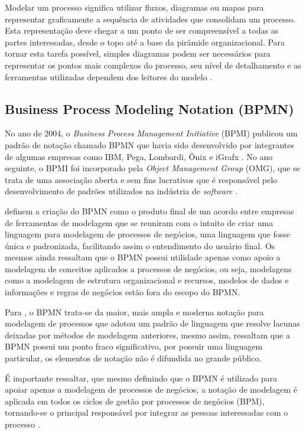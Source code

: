 \documentclass[
	12pt,				%
	openright,			%
	oneside,			%
	a4paper,			%
	chapter=TITLE,		%
	section=TITLE,		%
	english,			%
	french,				%
	spanish,			%
	brazil				%
	]{abntex2}
\begin{document}
Modelar um processo significa utilizar fluxos, diagramas ou mapas para representar graficamente a sequência de atividades que consolidam um processo. Esta representação deve chegar a um ponto de ser compreensível a todas as partes interessadas, desde o topo até a base da pirâmide organizacional. Para tornar esta tarefa possível, simples diagramas podem ser necessários para representar os pontos mais complexos do processo, seu nível de detalhamento e as ferramentas utilizadas dependem dos leitores do modelo \cite{juniorMapeamentoGestaoProcessos}.


\subsection{Business Process Modeling Notation (BPMN)}
No ano de 2004, o \textit{Business Process Management Initiative} (BPMI) publicou um padrão de notação chamado BPMN que havia sido desenvolvido por integrantes de algumas empresas como IBM, Pega, Lombardi, Ônix e iGrafx \cite{valleBarbaraBPMN}. No ano seguinte, o BPMI foi incorporado pela \textit{Object Management Group} (OMG), que se trata de uma associação aberta e sem fins lucrativos que é responsável pelo desenvolvimento de padrões utilizados na indústria de \textit{software} \cite{araujoGestao}.

 definem a criação do BPMN como o produto final de um acordo entre empresas de ferramentas de modelagem que se reuniram com o intuito de criar uma linguagem para modelagem de processos de negócios, uma linguagem que fosse única e padronizada, facilitando assim o entendimento do usuário final. Os mesmos ainda ressaltam que o BPMN possui utilidade apenas como apoio a modelagem de conceitos aplicados a processos de negócios, ou seja, modelagens como a modelagem de estrutura organizacional e recursos, modelos de dados e informações e regras de negócios estão fora do escopo do BPMN. 

Para , o BPMN trata-se da maior, mais ampla e moderna notação para modelagem de processos que adotou um padrão de linguagem que resolve lacunas deixadas por métodos de modelagem anteriores, mesmo assim, ressaltam que a BPMN possui um ponto fraco significativo, por possuir uma linguagem particular, os elementos de notação não é difundida no grande público. 

É importante ressaltar, que mesmo  definindo que o BPMN é utilizado para apoiar apenas a modelagem de processos de negócios, a notação de modelagem é aplicada em todos os ciclos de gestão por processos de negócios (BPM), tornando-se o principal responsável por integrar as pessoas interessadas com o processo \cite{sordiGestaoModerna}.
\end{document}
